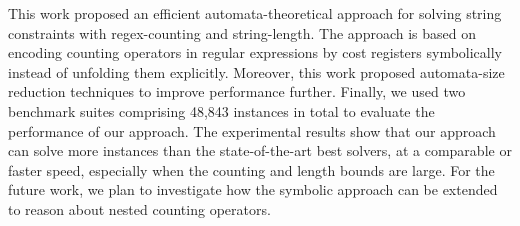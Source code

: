 
This work proposed an efficient automata-theoretical approach for solving string constraints with regex-counting and string-length. The approach is based on encoding counting operators in regular expressions by cost registers symbolically instead of unfolding them explicitly. Moreover, this work proposed automata-size reduction techniques to improve performance further. Finally, we used two benchmark suites comprising 48,843 instances in total to evaluate the performance of our approach. The experimental results show that our approach can solve more instances than the state-of-the-art best solvers, at a comparable or faster speed, especially when the counting and length bounds are large. 
For the future work, we plan to investigate how the symbolic approach can be extended to reason about nested counting operators. 

